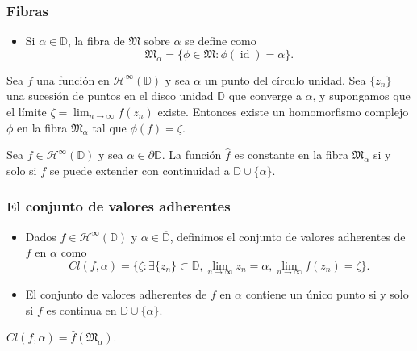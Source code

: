 \documentclass[spanish, a4paper, 12pt, final, slideColor, nototal, colorBG, pdf, noaccumulate, darkblue]{beamer}
\providecommand{\bholomorphic}[1]{\mathcal{H}^{\infty}(#1)}
\newcommand{\disk}{\mathbb{D}}
\newcommand{\closedisk}{\overline{\disk}}
\newcommand{\id}{\operatorname{id}}
\newcommand{\fiber}{\mathfrak{M}}
\begin{document}
\begin{frame}
    \frametitle{Fibras}
    \begin{itemize}
        \item Si $\alpha \in \closedisk$, la fibra de $\fiber$ sobre $\alpha$ se define como
        \begin{equation*}
            \fiber_\alpha = \{\phi \in \fiber : \phi (\id) = \alpha\}.
        \end{equation*}
    \end{itemize}

    \begin{block}{}
        Sea $f$ una función en $\bholomorphic{\disk}$ y sea $\alpha$ un punto del círculo unidad. Sea $\{z_n\}$ una sucesión de puntos en el disco unidad $\disk$ que converge a $\alpha$, y supongamos que el límite $\zeta = \lim_{n \to \infty} f(z_n)$ existe. Entonces existe un homomorfismo complejo $\phi$ en la fibra $\fiber_\alpha$ tal que $\phi(f) = \zeta$.
    \end{block}

    \begin{block}{}
        Sea $f \in \bholomorphic{\disk}$ y sea $\alpha \in \partial \disk$. La función $\widehat f$ es constante en la fibra $\fiber_\alpha$ si y solo si $f$ se puede extender con continuidad a $\disk \cup \{\alpha\}.$
    \end{block}
\end{frame}

\begin{frame}
    \frametitle{El conjunto de valores adherentes}
    \begin{itemize}
        \item  Dados $f \in \bholomorphic{\disk}$ y $\alpha \in \closedisk$, definimos el conjunto de valores adherentes de $f$ en $\alpha$ como
            \begin{equation*}
                Cl(f, \alpha) = \{\zeta : \exists \{z_n\} \subset \disk, \lim_{n \to \infty} z_n = \alpha, \lim_{n \to \infty} f(z_n) = \zeta \}.
            \end{equation*}

        \item El conjunto de valores adherentes de $f$ en $\alpha$ contiene un único punto si y solo si $f$ es continua en $\disk \cup \{\alpha\}$.
    \end{itemize}

    \begin{block}{} \centering
         $Cl(f, \alpha) = \widehat{f}(\fiber_\alpha)$.
    \end{block}
\end{frame}
\end{document}
